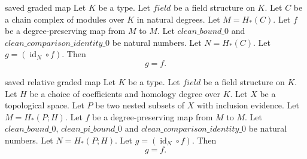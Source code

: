\begin{cleanresult}{saved graded map}
Let $K$ be a type.
Let $\mathit{field}$ be a field structure on $K$.
Let $C$ be a chain complex of modules over $K$ in natural degrees.
Let $M = H_*(C)$.
Let $f$ be a degree-preserving map from $M$ to $M$.
Let $\mathit{clean\_bound\_0}$ and $\mathit{clean\_comparison\_identity\_0}$ be natural numbers.
Let $N = H_*(C)$.
Let $g = (\operatorname{id}_{N} \circ f)$.
Then \[g = f.\]
\end{cleanresult}

\begin{cleanresult}{saved relative graded map}
Let $K$ be a type.
Let $\mathit{field}$ be a field structure on $K$.
Let $H$ be a choice of coefficients and homology degree over $K$.
Let $X$ be a topological space.
Let $P$ be two nested subsets of $X$ with inclusion evidence.
Let $M = H_*(P;H)$.
Let $f$ be a degree-preserving map from $M$ to $M$.
Let $\mathit{clean\_bound\_0}$, $\mathit{clean\_pi\_bound\_0}$ and $\mathit{clean\_comparison\_identity\_0}$ be natural numbers.
Let $N = H_*(P;H)$.
Let $g = (\operatorname{id}_{N} \circ f)$.
Then \[g = f.\]
\end{cleanresult}

